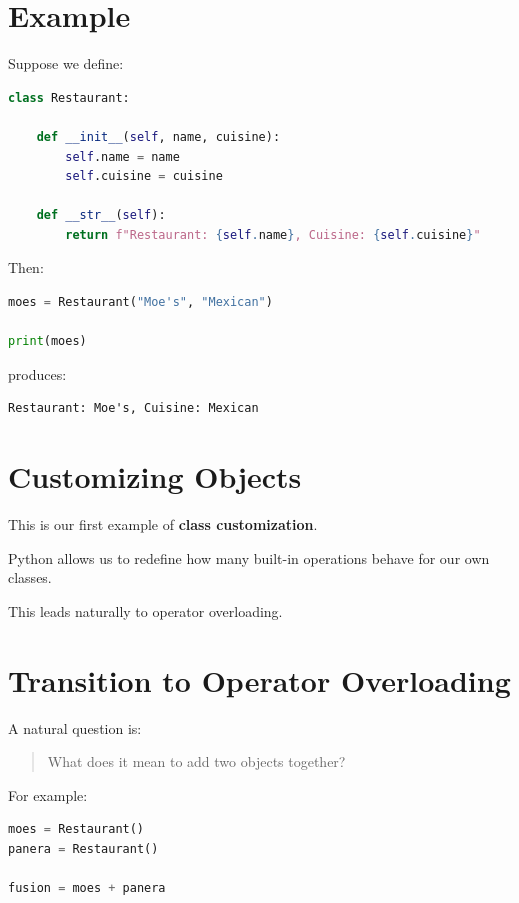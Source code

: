 \documentclass[11pt]{article}
\begin{document}
\section{Example}

Suppose we define:

\begin{lstlisting}[language=Python]
class Restaurant:

    def __init__(self, name, cuisine):
        self.name = name
        self.cuisine = cuisine

    def __str__(self):
        return f"Restaurant: {self.name}, Cuisine: {self.cuisine}"
\end{lstlisting}

Then:

\begin{lstlisting}[language=Python]
moes = Restaurant("Moe's", "Mexican")

print(moes)
\end{lstlisting}

produces:

\begin{lstlisting}
Restaurant: Moe's, Cuisine: Mexican
\end{lstlisting}

\section{Customizing Objects}

This is our first example of \textbf{class customization}.

Python allows us to redefine how many built-in operations behave for our own classes.

This leads naturally to operator overloading.

\section{Transition to Operator Overloading}

A natural question is:

\begin{quote}
What does it mean to add two objects together?
\end{quote}

For example:

\begin{lstlisting}[language=Python]
moes = Restaurant()
panera = Restaurant()

fusion = moes + panera
\end{lstlisting}
\end{document}
